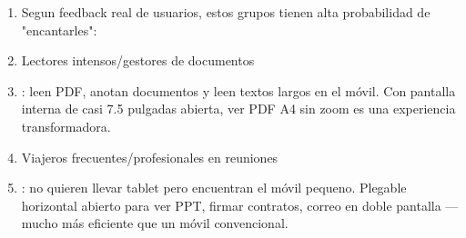\begin{enumerate}
  \item Segun feedback real de usuarios, estos grupos tienen alta probabilidad de "encantarles":
  \item Lectores intensos/gestores de documentos
  \item : leen PDF, anotan documentos y leen textos largos en el móvil. Con pantalla interna de casi 7.5 pulgadas abierta, ver PDF A4 sin zoom es una experiencia transformadora.
  \item Viajeros frecuentes/profesionales en reuniones
  \item : no quieren llevar tablet pero encuentran el móvil pequeno. Plegable horizontal abierto para ver PPT, firmar contratos, correo en doble pantalla — mucho más eficiente que un móvil convencional.
\end{enumerate}
